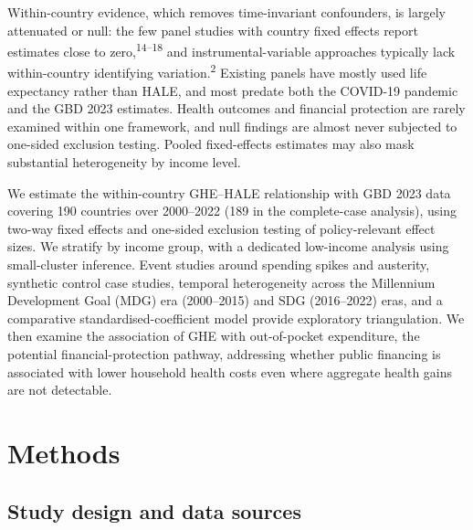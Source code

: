 \documentclass[12pt,a4paper]{article}
\begin{document}
Within-country evidence, which removes time-invariant confounders, is largely attenuated or null: the few panel studies with country fixed effects report estimates close to zero,\textsuperscript{14--18} and instrumental-variable approaches typically lack within-country identifying variation.\textsuperscript{2} Existing panels have mostly used life expectancy rather than HALE, and most predate both the COVID-19 pandemic and the GBD 2023 estimates. Health outcomes and financial protection are rarely examined within one framework, and null findings are almost never subjected to one-sided exclusion testing. Pooled fixed-effects estimates may also mask substantial heterogeneity by income level.

We estimate the within-country GHE--HALE relationship with GBD 2023 data covering 190 countries over 2000--2022 (189 in the complete-case analysis), using two-way fixed effects and one-sided exclusion testing of policy-relevant effect sizes. We stratify by income group, with a dedicated low-income analysis using small-cluster inference. Event studies around spending spikes and austerity, synthetic control case studies, temporal heterogeneity across the Millennium Development Goal (MDG) era (2000--2015) and SDG (2016--2022) eras, and a comparative standardised-coefficient model provide exploratory triangulation. We then examine the association of GHE with out-of-pocket expenditure, the potential financial-protection pathway, addressing whether public financing is associated with lower household health costs even where aggregate health gains are not detectable.


\section*{Methods}

\subsection*{Study design and data sources}
\end{document}
